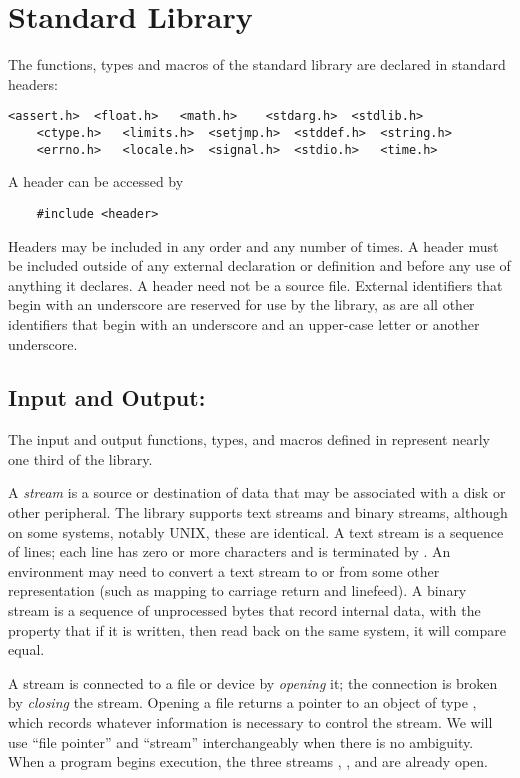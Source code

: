 
\chapter{Standard Library}

The functions, types and macros of the standard library are declared in standard headers:
\begin{lstlisting}[basicstyle=\ttfamily\small, keywordstyle=\color{black}, stringstyle=\color{black}]
	<assert.h> 	<float.h> 	<math.h> 	<stdarg.h> 	<stdlib.h>
	<ctype.h>  	<limits.h> 	<setjmp.h> 	<stddef.h> 	<string.h>
	<errno.h>  	<locale.h> 	<signal.h> 	<stdio.h> 	<time.h>
\end{lstlisting}
A header can be accessed by
\begin{lstlisting}
	#include <header>
\end{lstlisting}
Headers may be included in any order and any number of times.
A header must be included outside of any external declaration or definition and before any use of anything it declares.
A header need not be a source file.
External identifiers that begin with an underscore are reserved for use by the library, as are all other identifiers that begin with an underscore and an upper-case letter or another underscore.

\section{Input and Output: }

The input and output functions, types, and macros defined in  represent nearly one third of the library.

A \emph{stream} is a source or destination of data that may be associated with a disk or other peripheral.
The library supports text streams and binary streams, although on some systems, notably UNIX, these are identical.
A text stream is a sequence of lines; each line has zero or more characters and is terminated by .
An environment may need to convert a text stream to or from some other representation (such as mapping  to carriage return and linefeed).
A binary stream is a sequence of unprocessed bytes that record internal data, with the property that if it is written, then read back on the same system, it will compare equal.

A stream is connected to a file or device by \emph{opening} it; the connection is broken by \emph{closing} the stream.
Opening a file returns a pointer to an object of type , which records whatever information is necessary to control the stream.
We will use ``file pointer'' and ``stream'' interchangeably when there is no ambiguity.
When a program begins execution, the three streams , , and  are already open.

